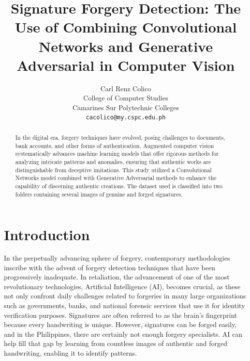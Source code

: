 \documentclass[12pt]{article}
\begin{document}
\title{\textbf{Signature Forgery Detection: The Use of Combining Convolutional Networks and Generative Adversarial in Computer Vision}}
\author{Carl Renz Colico \\ College of Computer Studies \\ Camarines Sur Polytechnic Colleges \\ \texttt{cacolico@my.cspc.edu.ph}}

\maketitle



\begin{abstract}
In the digital era, forgery techniques have evolved, posing challenges to documents, bank accounts, and other forms of authentication. Augmented computer vision systematically advances machine learning models that offer rigorous methods for analyzing intricate patterns and anomalies, ensuring that authentic works are distinguishable from deceptive imitations. This study utilized a Convolutional Networks model combined with Generative Adversarial methods to enhance the capability of discerning authentic creations. The dataset used is classified into two folders containing several images of genuine and forged signatures.
\end{abstract}

\section{Introduction}
In the perpetually advancing sphere of forgery, contemporary methodologies inscribe with the advent of forgery detection techniques that have been progressively inadequate. In retaliation, the advancement of one of the most revolutionary technologies, Artificial Intelligence (AI), becomes crucial, as these not only confront daily challenges related to forgeries in many large organizations such as governments, banks, and national forensic services that use it for identity verification purposes. Signatures are often referred to as the brain’s fingerprint because every handwriting is unique. However, signatures can be forged easily, and in the Philippines, there are certainly not enough forgery specialists. AI can help fill that gap by learning from countless images of authentic and forged handwriting, enabling it to identify patterns.
\end{document}
